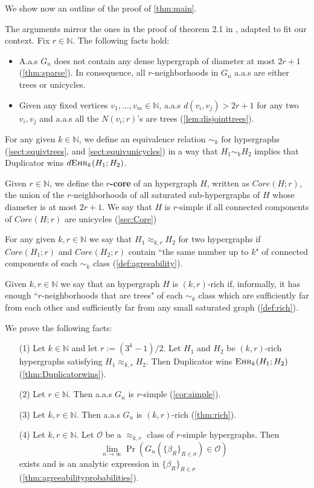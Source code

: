 \documentclass[12pt,notitlepage,a4paper]{article}
\theoremstyle{definition}
\newcommand{\N}{\mathbb{N}}
\newcommand{\Ln}{\lim\limits_{n\to \infty}}
\newcommand{\ehr}{\textsc{Ehr}}
\begin{document}
We show now an outline of the proof of \cref{thm:main}. \par 
The arguments mirror the ones in the proof of theorem 2.1
in \cite{lynch1992probabilities}, adapted to fit our context. Fix $r\in \N$.
The following facts hold:
\begin{itemize}
	\item A.a.s $G_n$ does not contain any dense hypergraph of diameter at most 
	$2r+1$ (\cref{thm:sparse}). In consequence, all $r$-neighborhoods in $G_n$
	a.a.s are either trees or unicycles.
	\item Given any fixed vertices $v_1,\dots, v_m\in\N$, a.a.s 
	$d(v_i,v_j)>2r+1$ for any two $v_i,v_j$ and a.a.s all the $N(v_i;r)$'s 
	are trees (\cref{lem:disjointtrees}).
\end{itemize} 
For any given $k\in \N$, we define an equivalence relation $\sim_k$ for 
hypergraphs (\cref{sect:equivtrees}, and \cref{sect:equivunicycles})
in a way that $H_1\sim_k H_2$ implies that Duplicator wins $d\ehr_{k}(H_1;H_2)$.\par
Given $r\in \N$, we define the \textbf{$r$-core} of an hypergraph $H$, 
written as $Core(H;r)$, the union of the $r$-neighborhoods of
all saturated sub-hypergraphs of $H$ whose diameter is at most $2r+1$.
We say that $H$ is $r$-simple if all connected components of
$Core(H;r)$ are unicycles (\cref{sec:Core}) \par
For any given $k,r\in \N$ we say that $H_1\approx_{k,r} H_2$ for two
hypergraphs if $Core(H_1;r)$ and $Core(H_2;r)$ contain ``the same number
up to $k$" of connected components of each $\sim_k$ class (\cref{def:agreeability}).\par
Given $k,r\in \N$ we say that an hypergraph $H$ is $(k,r)$-rich if, informally, 
it has enough ``$r$-neighborhoods that are trees" of each $\sim_k$ class which
are sufficiently far from each other and sufficiently far from any small saturated
graph (\cref{def:rich}). \par
We prove the following facts:
\begin{itemize}
	\item[(1)] Let $k\in \N$ and let $r:=(3^k-1)/2$. Let $H_1$ and $H_2$
	be $(k,r)$-rich hypergraphs satisfying $H_1\approx_{k,r} H_2$. Then
	Duplicator wins $\ehr_{k}(H_1; H_2)$ (\cref{thm:Duplicatorwins}).
	\item[(2)] Let $r\in \N$. Then a.a.s $G_n$ is $r$-simple (\cref{cor:simple}).
	\item[(3)] Let $k,r\in \N$. Then a.a.s $G_n$ is $(k,r)$-rich (\cref{thm:rich}).
	\item[(4)] Let $k,r \in \N$. Let $\mathcal{O}$ be a $\approx_{k,r}$ class
	of $r$-simple hypergraphs. Then 
	\[
	\Ln \Pr\left(G_n\left(\{\beta_R\}_{R\in \sigma}\right)\in \mathcal{O}\right)
	\]
	exists
	and is an analytic expression in $\{\beta_R\}_{R\in \sigma}$ 
	(\cref{thm:agreeabilityprobabilities}).
\end{itemize}
\end{document}
